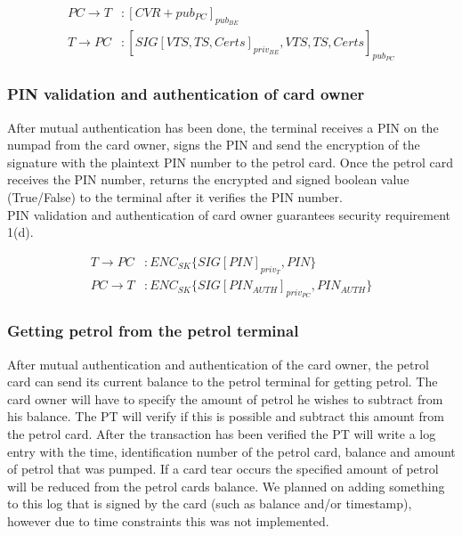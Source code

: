 \begin{equation}\nonumber
\begin{split}
PC \to T &: [CVR + pub_{PC}]_{pub_{BE}}\\
T \to PC &: [SIG[VTS, TS, Certs]_{priv_{BE}}, VTS, TS, Certs]_{pub_{PC}}
\end{split} 
\end{equation}

\subsubsection{PIN validation and authentication of card owner}
After mutual authentication has been done, the terminal receives a PIN on the numpad from the card owner, signs the PIN and send the encryption of the signature with the plaintext PIN number to the petrol card. Once the petrol card receives the PIN number, returns the encrypted and signed boolean value (True/False) to the terminal after it verifies the PIN number. \\

PIN validation and authentication of card owner guarantees security requirement 1(d).

\begin{equation}\nonumber
\begin{split}
T \to PC&: ENC_{SK}\{SIG[PIN]_{priv_T}, PIN\}\\
PC \to T&: ENC_{SK}\{SIG[PIN_{AUTH}]_{priv_{PC}}, PIN_{AUTH}\}
\end{split} 
\end{equation}

\subsubsection{Getting petrol from the petrol terminal}
After mutual authentication and authentication of the card owner, the petrol card can send its current balance to the petrol terminal for getting petrol. The card owner will have to specify the amount of petrol he wishes to subtract from his balance. The PT will verify if this is possible and subtract this amount from the petrol card. After the transaction has been verified the PT will write a log entry with the time, identification number of the petrol card, balance and amount of  petrol that was pumped. If a card tear occurs the specified amount of petrol will be reduced from the petrol cards balance. We planned on adding something to this log that is signed by the card (such as balance and/or timestamp), however due to time constraints this was not implemented.  %

